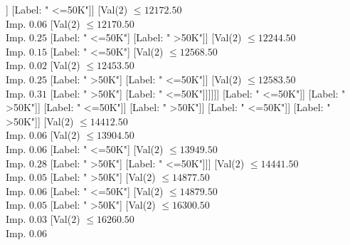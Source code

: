 \documentclass[margin=10pt]{standalone}
\begin{document}
\begin{forest}
																																	[Label: " <=50K"]
																																	[Label: " >50K"]]
																																[Label: " <=50K"]]
																															[Val($2$) $ \leq 12172.50$ \\ Imp. $0.06$
																																[Val($2$) $ \leq 12170.50$ \\ Imp. $0.25$
																																	[Label: " <=50K"]
																																	[Label: " >50K"]]
																																[Val($2$) $ \leq 12244.50$ \\ Imp. $0.15$
																																	[Label: " <=50K"]
																																	[Val($2$) $ \leq 12568.50$ \\ Imp. $0.02$
																																		[Val($2$) $ \leq 12453.50$ \\ Imp. $0.25$
																																			[Label: " >50K"]
																																			[Label: " <=50K"]]
																																		[Val($2$) $ \leq 12583.50$ \\ Imp. $0.31$
																																			[Label: " >50K"]
																																			[Label: " <=50K"]]]]]]
																														[Label: " <=50K"]]
																													[Label: " >50K"]]
																												[Label: " <=50K"]]
																											[Label: " >50K"]]
																										[Label: " <=50K"]]
																									[Label: " >50K"]]
																								[Val($2$) $ \leq 14412.50$ \\ Imp. $0.06$
																									[Val($2$) $ \leq 13904.50$ \\ Imp. $0.06$
																										[Label: " <=50K"]
																										[Val($2$) $ \leq 13949.50$ \\ Imp. $0.28$
																											[Label: " >50K"]
																											[Label: " <=50K"]]]
																									[Val($2$) $ \leq 14441.50$ \\ Imp. $0.05$
																										[Label: " >50K"]
																										[Val($2$) $ \leq 14877.50$ \\ Imp. $0.06$
																											[Label: " <=50K"]
																											[Val($2$) $ \leq 14879.50$ \\ Imp. $0.05$
																												[Label: " >50K"]
																												[Val($2$) $ \leq 16300.50$ \\ Imp. $0.03$
																													[Val($2$) $ \leq 16260.50$ \\ Imp. $0.06$

\end{forest}
\end{document}
